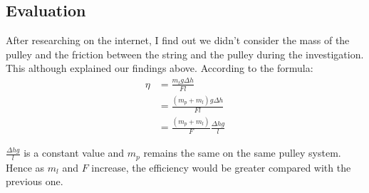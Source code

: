 \documentclass[12pt,a4paper]{article}
\begin{document}
\begin{spacing}{1.25}
\subsection{Evaluation}
After researching on the internet, I find out we didn't consider the mass of the pulley and the friction between the string and the pulley during the investigation. This although explained our findings above. According to the formula:
\begin{align*}
    \eta  & = \frac{m_{t}g\Delta h}{Fl} \\
    & = \frac{(m_p + m_l)g \Delta h}{Fl}\\ & = \frac{(m_p + m_l)}{F} \frac{\Delta h g}{l}
\end{align*}\par
$ \frac{\Delta h g}{l} $ is a constant value and $ m_p $ remains the same on the same pulley system. Hence as $ m_l $ and $ F $ increase, the efficiency would be greater compared with the previous one.

\end{spacing}
\end{document}
